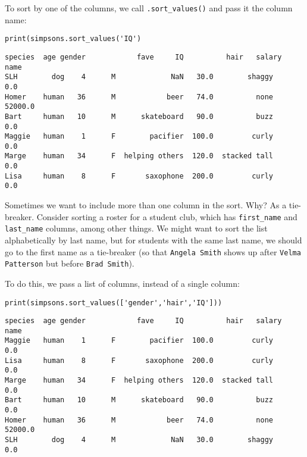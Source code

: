 To sort by one of the columns, we call \texttt{.sort\_values()} and pass it the
column name:

\begin{Verbatim}[fontsize=\small,samepage=true,frame=single,framesep=3mm]
print(simpsons.sort_values('IQ')
\end{Verbatim}
\vspace{-.2in}

\begin{Verbatim}[fontsize=\scriptsize,samepage=true,frame=leftline,framesep=5mm,framerule=1mm]
       species  age gender            fave     IQ          hair   salary
name                                                                    
SLH        dog    4      M             NaN   30.0        shaggy      0.0
Homer    human   36      M            beer   74.0          none  52000.0
Bart     human   10      M      skateboard   90.0          buzz      0.0
Maggie   human    1      F        pacifier  100.0         curly      0.0
Marge    human   34      F  helping others  120.0  stacked tall      0.0
Lisa     human    8      F       saxophone  200.0         curly      0.0
\end{Verbatim}


Sometimes we want to include more than one column in the sort. Why? As a
tie-breaker. Consider sorting a roster for a student club, which has
\texttt{first\_name} and \texttt{last\_name} columns, among other things. We
might want to sort the list alphabetically by last name, but for students with
the same last name, we should go to the first name as a tie-breaker (so that
\texttt{Angela Smith} shows up after \texttt{Velma Patterson} but before
\texttt{Brad Smith}).

To do this, we pass a list of columns, instead of a single column:

\begin{samepage}
\begin{Verbatim}[fontsize=\small,samepage=true,frame=single,framesep=3mm]
print(simpsons.sort_values(['gender','hair','IQ']))
\end{Verbatim}
\vspace{-.2in}

\begin{Verbatim}[fontsize=\scriptsize,samepage=true,frame=leftline,framesep=5mm,framerule=1mm]
       species  age gender            fave     IQ          hair   salary
name                                                                    
Maggie   human    1      F        pacifier  100.0         curly      0.0
Lisa     human    8      F       saxophone  200.0         curly      0.0
Marge    human   34      F  helping others  120.0  stacked tall      0.0
Bart     human   10      M      skateboard   90.0          buzz      0.0
Homer    human   36      M            beer   74.0          none  52000.0
SLH        dog    4      M             NaN   30.0        shaggy      0.0
\end{Verbatim}
\end{samepage}

